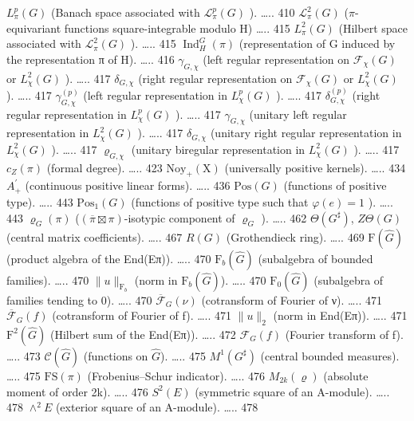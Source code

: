 \(L_{\pi}^{p}(G)\) (Banach space associated with \(\mathcal{L}_{\pi}^{p}(G)\) ). \ldots.. 410 \(\mathcal{L}_{\pi}^{2}(G)\) (\(\pi\)-equivariant functions square-integrable modulo H) \ldots.. 415 \(L_{\pi}^{2}(G)\) (Hilbert space associated with \(\mathcal{L}_{\pi}^{2}(G)\) ). \ldots.. 415 \(\operatorname{Ind}_{H}^{G}(\pi)\) (representation of G induced by the representation π of H). \ldots.. 416 \(\gamma_{G,\chi}\) (left regular representation on \(\mathcal{F}_{\chi}(G)\) or \(L_{\chi}^{2}(G)\) ). \ldots.. 417 \(\delta_{G,\chi}\) (right regular representation on \(\mathcal{F}_{\chi}(G)\) or \(L_{\chi}^{2}(G)\) ). \ldots.. 417 \(\gamma_{G,\chi}^{(p)}\) (left regular representation in \(L_{\chi}^{p}(G)\) ). \ldots.. 417 \(\delta_{G,\chi}^{(p)}\) (right regular representation in \(L_{\chi}^{p}(G)\) ). \ldots.. 417 \(\gamma_{G,\chi}\) (unitary left regular representation in \(L_{\chi}^{2}(G)\) ). \ldots.. 417 \(\delta_{G,\chi}\) (unitary right regular representation in \(L_{\chi}^{2}(G)\) ). \ldots.. 417 \(\varrho_{G,\chi}\) (unitary biregular representation in \(L_{\chi}^{2}(G)\) ). \ldots.. 417 \(c_{Z}(\pi)\) (formal degree). \ldots.. 423 \(\mathrm{Noy}_{+}(\mathrm{X})\) (universally positive kernels). \ldots.. 434 \(A_{+}^{\prime}\) (continuous positive linear forms). \ldots.. 436 \(\mathrm{Pos}(G)\) (functions of positive type). \ldots.. 443 \(\mathrm{Pos}_{1}(G)\) (functions of positive type such that \(\varphi(e)=1\) ). \ldots.. 443 \(\varrho_{G}(\pi)\) (\((\overline{\pi}\boxtimes\pi)\)-isotypic component of \(\varrho_{G}\) ). \ldots.. 462 \(\Theta(G^{\sharp})\), \(Z\Theta(G)\) (central matrix coefficients). \ldots.. 467 \(R(G)\) (Grothendieck ring). \ldots.. 469 \(\mathrm{F}(\widehat{G})\) (product algebra of the End(Eπ)). \ldots.. 470 \(\mathrm{F}_{b}(\widehat{G})\) (subalgebra of bounded families). \ldots.. 470 \(\|u\|_{\mathrm{F}_{b}}\) (norm in \(\mathrm{F}_{b}(\widehat{G})\)). \ldots.. 470 \(\mathrm{F}_{0}(\widehat{G})\) (subalgebra of families tending to 0). \ldots.. 470 \(\overline{\mathcal{F}}_{G}(\nu)\) (cotransform of Fourier of ν). \ldots.. 471 \(\overline{\mathcal{F}}_{G}(f)\) (cotransform of Fourier of f). \ldots.. 471 \(\|u\|_{2}\) (norm in End(Eπ)). \ldots.. 471 \(\mathrm{F}^{2}(\widehat{G})\) (Hilbert sum of the End(Eπ)). \ldots.. 472 \(\mathcal{F}_{G}(f)\) (Fourier transform of f). \ldots.. 473 \(\mathcal{C}(\widehat{G})\) (functions on \(\widehat{G}\)). \ldots.. 475 \(M^{1}(G^{\sharp})\) (central bounded measures). \ldots.. 475 \(\mathrm{FS}(\pi)\) (Frobenius--Schur indicator). \ldots.. 476 \(M_{2k}(\varrho)\) (absolute moment of order 2k). \ldots.. 476 \(S^{2}(E)\) (symmetric square of an A-module). \ldots.. 478 \(\wedge^{2}E\) (exterior square of an A-module). \ldots.. 478

